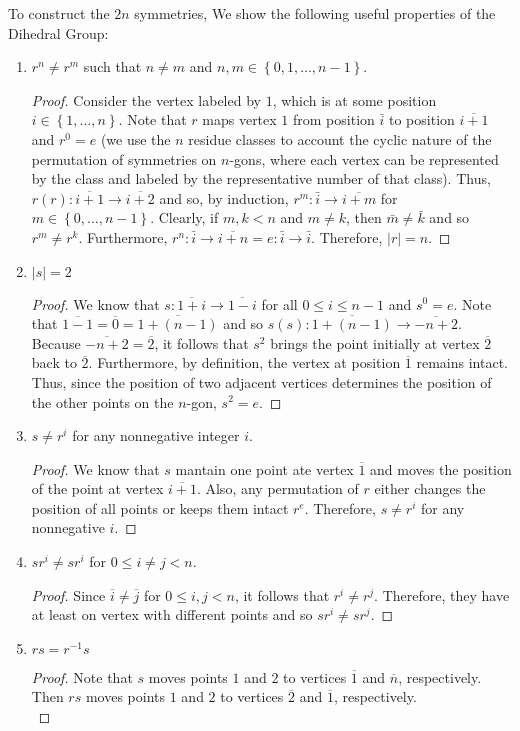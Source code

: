 \documentclass[12pt]{article}
\begin{document}
      To construct the $2n$ symmetries, We show the following useful properties of the Dihedral Group:
\begin{enumerate}
  \item $r^{n}\neq r^{m}$ such that $n\neq m$ and $n,m\in \left\{ 0,1,\dots,n-1 \right\}$.
\begin{proof}
  Consider the vertex labeled by $1$, which is at some position $i\in \left\{ 1,\dots,n \right\}$. Note that $r$ maps vertex $1$ from position $\bar{i}$ to position $\overline{i+1}$ and $r^{0}=e$ (we use the $n$ residue classes to account the cyclic nature of the permutation of symmetries on $n$-gons, where each vertex can be represented by the class and labeled by the representative number of that class). Thus, $r(r): \overline{i+1}\to\overline{i+2}$ and so, by induction, $r^{m}: \bar{i}\to \overline{i+m}$ for $m\in \left\{ 0,\dots, n-1\right\}$. Clearly, if $m,k<n$ and  $m\neq k$, then $\bar{m}\neq \bar{k}$ and so $r^{m}\neq r^{k}$. Furthermore, $r^{n}:\bar{i}\to\overline{i+n} = e:\bar{i}\to\bar{i}$. Therefore, $|r|=n$.  
\end{proof}
\item $|s|=2$
\begin{proof}
  We know that $s:\overline{1+i}\to\overline{1-i}$ for all $0\leq i \leq n-1$ and $s^{0} = e$. Note that $\overline{1-1} = \overline{0} = \overline{1+(n-1)}$ and so $s(s):\overline{1+(n-1)}\to\overline{-n+2}$. Because $\overline{-n+2} = \overline{2}$, it follows that $s^{2}$ brings the point initially at vertex $\overline{2}$ back to $\overline{2}$. Furthermore, by definition, the vertex at position $\overline{1}$ remains intact. Thus, since the position of two adjacent vertices determines the position of the other points on the $n$-gon, $s^{2}=e$.
\end{proof}
\item $s\neq r^{i}$ for any nonnegative integer $i$.
\begin{proof}
  We know that $s$ mantain one point ate vertex $\overline{1}$ and moves the position of the point at vertex $\overline{i+1}$. Also, any permutation of $r$ either changes the position of all points or keeps them intact $r^{e}$. Therefore, $s\neq r^{i}$ for any nonnegative $i$. 
\end{proof}
\item $sr^{i} \neq sr^{i}$ for $0\leq i\neq j<n$.
\begin{proof}
  Since $\overline{i}\neq \overline{j}$ for $0\leq i,j<n$, it follows that $r^{i}\neq r^{j}$. Therefore, they have at least on vertex with different points and so $sr^{i}\neq sr^{j}$. 
\end{proof}
\item $rs = r^{-1}s$
\begin{proof}
  Note that $s$ moves points $1$ and $2$ to vertices $\overline{1}$ and $\overline{n}$, respectively. Then $rs$ moves points $1$ and $2$ to vertices $\overline{2}$ and $\overline{1}$, respectively.\\


\end{proof}
\end{enumerate}
\end{document}
